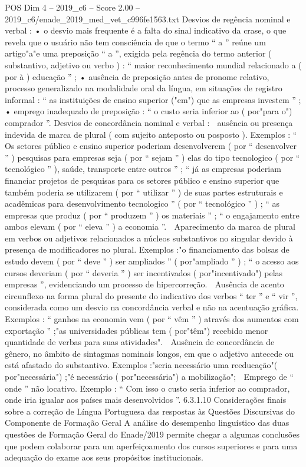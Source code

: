 \begin{textsample}{POS Dim 4 – 2019\_c6 – Score 2.00 – 2019\_c6/enade\_2019\_med\_vet\_c996fe1563.txt}
Desvios de regência nominal e verbal : • o desvio mais frequente é a falta do sinal indicativo da crase, o que revela que o usuário não tem consciência de que o termo “ a ” reúne um artigo"a"e uma preposição “ a ”, exigida pela regência do termo anterior ( substantivo, adjetivo ou verbo ) : “ maior reconhecimento mundial relacionado a ( por à ) educação ” ; • ausência de preposição antes de pronome relativo, processo generalizado na modalidade oral da língua, em situações de registro informal : “ as instituições de ensino superior ("em") que as empresas investem ” ; • emprego inadequado de preposição : “ o custo seria inferior ao ( por"para o") comprador ”.
Desvios de concordância nominal e verbal :  ausência ou presença indevida de marca de plural ( com sujeito anteposto ou posposto ).
Exemplos : “ Os setores público e ensino superior poderiam desenvolverem ( por “ desenvolver ” ) pesquisas para empresas seja ( por “ sejam ” ) elas do tipo tecnologico ( por “ tecnológico ” ), saúde, transporte entre outros ” ; “ já as empresas poderiam financiar projetos de pesquisas para os setores público e ensino superior que também poderia se utilizarem ( por “ utilizar ” ) de suas partes estruturais e acadêmicas para desenvolvimento tecnologico ” ( por “ tecnológico ” ) ; “ as empresas que produz ( por “ produzem ” ) os materiais ” ; “ o engajamento entre ambos elevam ( por “ eleva ” ) a economia ”.  Aparecimento da marca de plural em verbos ou adjetivos relacionados a núcleos substantivos no singular devido à presença de modificadores no plural.
Exemplos :"o financiamento das bolsas de estudo devem ( por “ deve ” ) ser ampliados ” ( por"ampliado ” ) ; “ o acesso aos cursos deveriam ( por “ deveria ” ) ser incentivados ( por"incentivado") pelas empresas ”, evidenciando um processo de hipercorreção.  Ausência de acento circunflexo na forma plural do presente do indicativo dos verbos “ ter ” e “ vir ”, considerada como um desvio na concordância verbal e não na acentuação gráfica.
Exemplos : “ ganhos na economia vem ( por “ vêm ” ) através dos aumentos com exportação ” ;"as universidades públicas tem ( por"têm") recebido menor quantidade de verbas para suas atividades".  Ausência de concordância de gênero, no âmbito de sintagmas nominais longos, em que o adjetivo antecede ou está afastado do substantivo.
Exemplos :"seria necessário uma reeducação"( por"necessária") ;"é necessário ( por"necessária") a mobilização";  Emprego de “ onde ” não locativo.
Exemplo : “ Com isso o custo seria inferior ao comprador, onde iria igualar aos países mais desenvolvidos ”. 6.3.1.10 Considerações finais sobre a correção de Língua Portuguesa das respostas às Questões Discursivas do Componente de Formação Geral A análise do desempenho linguístico das duas questões de Formação Geral do Enade/2019 permite chegar a algumas conclusões que podem colaborar para um aperfeiçoamento dos cursos superiores e para uma adequação do exame aos seus propósitos institucionais.

\end{textsample}
